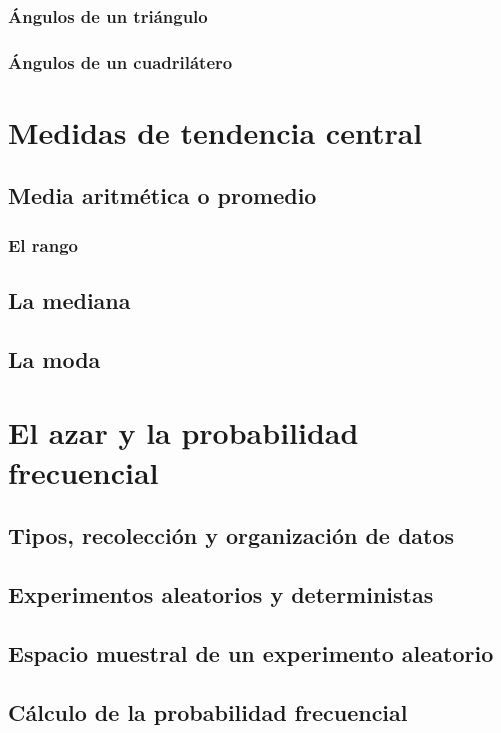 \documentclass[12pt]{book}
\begin{document}
\begin{mainmatter}
    \subsubsection{\'Angulos de un tri\'angulo}
    \subsubsection{\'Angulos de un cuadril\'atero}

    \section{Medidas de tendencia central}
    \subsection{Media aritm\'etica o promedio}
    \subsubsection{El rango}
    \subsection{La mediana}
    \subsection{La moda}

    \section{El azar y la probabilidad frecuencial}
    \subsection{Tipos, recolección y organización de datos}
    \subsection{Experimentos aleatorios y deterministas}
    \subsection{Espacio muestral de un experimento aleatorio}
    \subsection{Cálculo de la probabilidad frecuencial}


\end{mainmatter}
\end{document}
